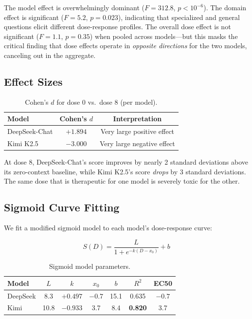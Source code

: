\documentclass[11pt,a4paper]{article}
\begin{document}
The model effect is overwhelmingly dominant ($F = 312.8$, $p < 10^{-6}$). The domain effect is significant ($F = 5.2$, $p = 0.023$), indicating that specialized and general questions elicit different dose-response profiles. The overall dose effect is not significant ($F = 1.1$, $p = 0.35$) when pooled across models---but this masks the critical finding that dose effects operate in \emph{opposite directions} for the two models, canceling out in the aggregate.

\subsection{Effect Sizes}

\begin{table}[h]
\centering
\caption{Cohen's $d$ for dose 0 vs.\ dose 8 (per model).}
\label{tab:effect}
\small
\begin{tabular}{@{}lcc@{}}
\toprule
\textbf{Model} & \textbf{Cohen's $d$} & \textbf{Interpretation} \\
\midrule
DeepSeek-Chat & $+1.894$ & Very large positive effect \\
Kimi K2.5     & $-3.000$ & Very large negative effect \\
\bottomrule
\end{tabular}
\end{table}

At dose 8, DeepSeek-Chat's score improves by nearly 2 standard deviations above its zero-context baseline, while Kimi K2.5's score \emph{drops} by 3 standard deviations. The same dose that is therapeutic for one model is severely toxic for the other.

\subsection{Sigmoid Curve Fitting}

We fit a modified sigmoid model to each model's dose-response curve:

\begin{equation}
  S(D) = \frac{L}{1 + e^{-k(D - x_0)}} + b
\end{equation}

\begin{table}[h]
\centering
\caption{Sigmoid model parameters.}
\label{tab:sigmoid}
\small
\begin{tabular}{@{}lcccccc@{}}
\toprule
\textbf{Model} & $L$ & $k$ & $x_0$ & $b$ & $R^2$ & \textbf{EC50} \\
\midrule
DeepSeek & 8.3 & $+0.497$ & $-0.7$ & 15.1 & 0.635 & $-0.7$ \\
Kimi     & 10.8 & $-0.933$ & 3.7   & 8.4  & \textbf{0.820} & 3.7 \\
\bottomrule
\end{tabular}
\end{table}
\end{document}
